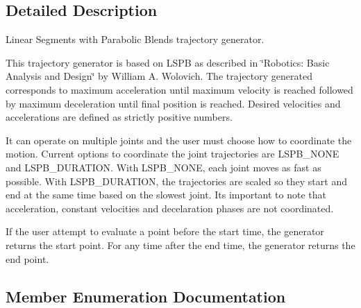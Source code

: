 \subsection{Detailed Description}
Linear Segments with Parabolic Blends trajectory generator. 

This trajectory generator is based on L\+S\+P\+B as described in \char`\"{}\+Robotics\+:
\+Basic Analysis and Design\char`\"{} by William A. Wolovich. The trajectory generated corresponds to maximum acceleration until maximum velocity is reached followed by maximum deceleration until final position is reached. Desired velocities and accelerations are defined as strictly positive numbers.

It can operate on multiple joints and the user must choose how to coordinate the motion. Current options to coordinate the joint trajectories are L\+S\+P\+B\+\_\+\+N\+O\+N\+E and L\+S\+P\+B\+\_\+\+D\+U\+R\+A\+T\+I\+O\+N. With L\+S\+P\+B\+\_\+\+N\+O\+N\+E, each joint moves as fast as possible. With L\+S\+P\+B\+\_\+\+D\+U\+R\+A\+T\+I\+O\+N, the trajectories are scaled so they start and end at the same time based on the slowest joint. It\textquotesingle{}s important to note that acceleration, constant velocities and decelaration phases are not coordinated.

If the user attempt to evaluate a point before the start time, the generator returns the start point. For any time after the end time, the generator returns the end point. 

\subsection{Member Enumeration Documentation}
\hypertarget{classrob_l_s_p_b_a8feec61f7c94670dbdbe75e63dec8496}{}
